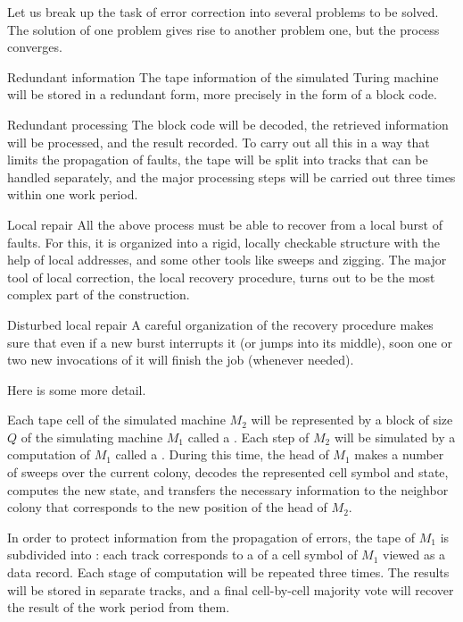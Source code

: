 \documentclass[12pt]{memoir}
\begin{document}
Let us break up the task of error correction into several 
problems to be solved.
The solution of one problem gives rise to another problem one, 
but the process converges.
\begin{flushdescription}
\item[Redundant information] The tape information of the simulated Turing machine
will be stored in a redundant form, more precisely in the form of a block code.
\item[Redundant processing] The block code will be decoded, the retrieved information 
will be processed, and the result recorded.
To carry out all this in a way that limits the propagation of faults, the tape will be split
into tracks that can be handled separately, and the major processing steps will be 
carried out three times within one work period.
\item[Local repair] All the above process must be able to recover from a local burst of faults.
For this, it is organized into a rigid, locally checkable structure
with the help of local addresses, and some other tools like sweeps and 
zigging.
The major tool of local correction, the local recovery procedure, turns out to be the most
complex part of the construction.
\item[Disturbed local repair] A careful organization of the recovery procedure
makes sure that even if a new burst interrupts it (or jumps into its middle),
soon one or two new invocations of it will finish the job (whenever needed).
\end{flushdescription}

Here is some more detail.

Each tape cell of the simulated machine \( M_{2} \) will be represented by a block of
size \( Q \) of the simulating machine \( M_{1} \) called a .
Each step of \( M_{2} \) will be simulated by a computation of \( M_{1} \) called
a .
During this time, the head of \( M_{1} \) makes a number of sweeps over the
current colony, decodes the represented cell symbol and state,
computes the new state, and transfers the necessary information to the 
neighbor colony that corresponds to the new position of the head of \( M_{2} \).

In order to protect information from the propagation of errors,
the tape of \( M_{1} \) is subdivided into : each track corresponds to a 
 of a cell symbol of \( M_{1} \) viewed as a data record.
Each stage of computation will be repeated three times.
The results will be stored in separate tracks, and a final cell-by-cell majority vote
will recover the result of the work period from them.
\end{document}

